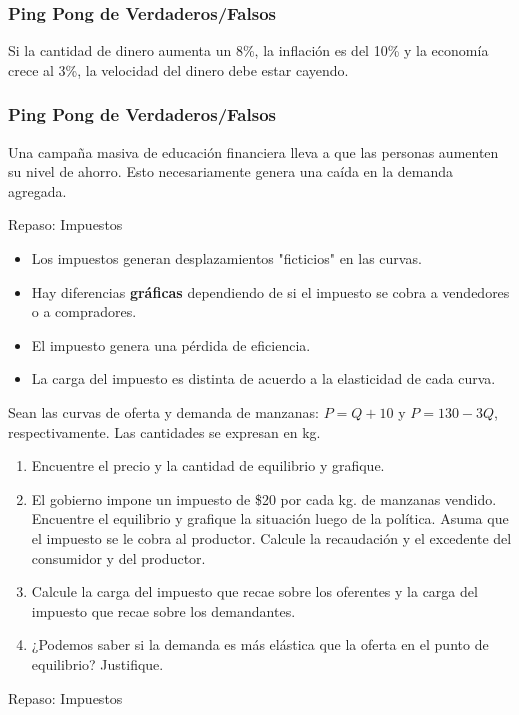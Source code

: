\documentclass{beamer}
\begin{document}
\begin{frame}
\frametitle{Ping Pong de Verdaderos/Falsos}
\centering
Si la cantidad de dinero aumenta un 8\%, la inflación es del 10\% y la economía crece al 3\%, la velocidad del dinero debe estar cayendo.
\end{frame}

\begin{frame}
\frametitle{Ping Pong de Verdaderos/Falsos}
\centering
Una campaña masiva de educación financiera lleva a que las personas aumenten su nivel de ahorro. Esto necesariamente genera una caída en la demanda agregada.
\end{frame}

\begin{frame}{Repaso: Impuestos}
    \small
    \begin{itemize}
        \item Los impuestos generan desplazamientos "ficticios" en las curvas.
        \item Hay diferencias \textbf{gráficas} dependiendo de si el impuesto se cobra a vendedores o a compradores.
        \item El impuesto genera una pérdida de eficiencia.
        \item La carga del impuesto es distinta de acuerdo a la elasticidad de cada curva.
    \end{itemize}

    Sean las curvas de oferta y demanda de manzanas: \( P = Q + 10 \) y \( P = 130 - 3Q \), respectivamente. Las cantidades se expresan en kg.

    \begin{enumerate}
        \item Encuentre el precio y la cantidad de equilibrio y grafique.
        \item El gobierno impone un impuesto de \$20 por cada kg. de manzanas vendido. Encuentre el equilibrio y grafique la situación luego de la política. Asuma que el impuesto se le cobra al productor. Calcule la recaudación y el excedente del consumidor y del productor.
        \item Calcule la carga del impuesto que recae sobre los oferentes y la carga del impuesto que recae sobre los demandantes.
        \item ¿Podemos saber si la demanda es más elástica que la oferta en el punto de equilibrio? Justifique.
    \end{enumerate}
\end{frame}

\begin{frame}{Repaso: Impuestos}

\end{frame}
\end{document}
